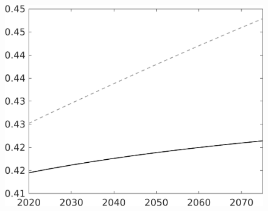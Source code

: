 \documentclass[12pt]{article}
\begin{document}
\begin{figure}[h!!]
\begin{minipage}[]{0.32\textwidth}
	\end{minipage}	
	\begin{minipage}[]{0.32\textwidth}
		\includegraphics[width=1\textwidth]{../../codding_model/own_basedOnFried/optimalPol_010922_revision/figures/all_13Sept22/LevTaufNoTauf_TaulCalib_regime0_EY_spillover0_nsk0_xgr0_knspil1_sep1_LFlimit0_emsbase0_countec0_GovRev0_etaa0.79_lgd0.png}
	\end{minipage}		
\end{figure}
\end{document}
